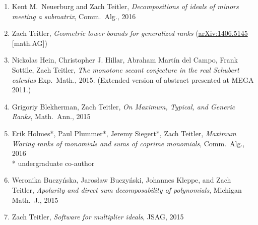 \documentclass[12pt]{article}
\begin{document}
\begin{enumerate}
\item Kent M.\ Neuerburg and Zach Teitler,
\emph{Decompositions of ideals of minors meeting a submatrix},
Comm.\ Alg.,
2016

\item Zach Teitler,
\emph{Geometric lower bounds for generalized ranks} %
(\href{http://arxiv.org/abs/1406.5145}{arXiv:1406.5145} [math.AG])

\item Nickolas Hein, Christopher J. Hillar, Abraham Mart\'in del Campo, Frank Sottile, Zach Teitler,
\emph{The monotone secant conjecture in the real Schubert calculus}
Exp.\ Math.,
2015.
(Extended version of abstract presented at MEGA 2011.)

\item Grigoriy Blekherman, Zach Teitler,
\emph{On Maximum, Typical, and Generic Ranks},
Math.\ Ann.,
2015

\item Erik Holmes*, Paul Plummer*, Jeremy Siegert*, Zach Teitler,
\emph{Maximum Waring ranks of monomials and sums of coprime monomials},
Comm.\ Alg.,
2016\\
* undergraduate co-author

\item Weronika Buczy\'nska, Jaros{\l}aw Buczy\'nski, Johannes Kleppe, and Zach Teitler,
\emph{Apolarity and direct sum decomposability of polynomials},
Michigan Math.\ J.,
2015

\item Zach Teitler,
\emph{Software for multiplier ideals},
JSAG,
2015


\end{enumerate}
\end{document}
